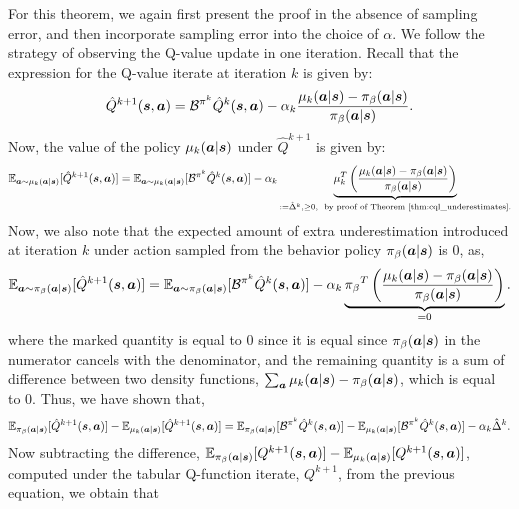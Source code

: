 For this theorem, we again first present the proof in the absence of sampling error, and then incorporate sampling error into the choice of $\alpha$. We follow the strategy of observing the Q-value update in one iteration. Recall that the expression for the Q-value iterate at iteration $k$ is given by:
\begin{equation*}
    \hat{Q}^{k+1}(\boldsymbol{s}, \boldsymbol{a}) = \mathcal{B}^{\pi^k} \hat{Q}^{k}(\boldsymbol{s}, \boldsymbol{a}) - \alpha_k \frac{\mu_k(\boldsymbol{a}|\boldsymbol{s}) - {\pi_\beta}(\boldsymbol{a}|\boldsymbol{s})}{{\pi_\beta}(\boldsymbol{a}|\boldsymbol{s})}.
\end{equation*}
Now, the value of the policy $\mu_{k}(\boldsymbol{a}|\boldsymbol{s})$ under $\hat{Q}^{k+1}$ is given by:
\begin{equation*}
    \mathbb{E}_{\boldsymbol{a} \sim \mu_k(\boldsymbol{a}|\boldsymbol{s})}[\hat{Q}^{k+1}(\boldsymbol{s}, \boldsymbol{a})] = \mathbb{E}_{\boldsymbol{a} \sim \mu_k(\boldsymbol{a}|\boldsymbol{s})}[\mathcal{B}^{\pi^k} \hat{Q}^k (\boldsymbol{s}, \boldsymbol{a})] - \alpha_k \underbrace{\mu_k^T \left(\frac{\mu_k(\boldsymbol{a}|\boldsymbol{s}) - {\pi_\beta}(\boldsymbol{a}|\boldsymbol{s})}{{\pi_\beta}(\boldsymbol{a}|\boldsymbol{s})} \right)}_{:= \hat{\Delta}^k, \geq 0, \text{~~by proof of Theorem~\ref{thm:cql_underestimates}.}} 
\end{equation*}
Now, we also note that the expected amount of extra underestimation introduced at iteration $k$ under action sampled from the behavior policy ${\pi_\beta}(\boldsymbol{a}|\boldsymbol{s})$ is 0, as,
\begin{equation*}
    \mathbb{E}_{\boldsymbol{a} \sim {\pi_\beta}(\boldsymbol{a}|\boldsymbol{s})}[\hat{Q}^{k+1}(\boldsymbol{s}, \boldsymbol{a})] = \mathbb{E}_{\boldsymbol{a} \sim {\pi_\beta}(\boldsymbol{a}|\boldsymbol{s})}[\mathcal{B}^{\pi^k} \hat{Q}^k (\boldsymbol{s}, \boldsymbol{a})] - \alpha_k \underbrace{{\pi_\beta}^T \left(\frac{\mu_k(\boldsymbol{a}|\boldsymbol{s}) - {\pi_\beta}(\boldsymbol{a}|\boldsymbol{s})}{{\pi_\beta}(\boldsymbol{a}|\boldsymbol{s})} \right)}_{= 0}. 
\end{equation*}
where the marked quantity is equal to 0 since it is equal since ${\pi_\beta}(\boldsymbol{a}|\boldsymbol{s})$ in the numerator cancels with the denominator, and the remaining quantity is a sum of difference between two density functions, $\sum_{\boldsymbol{a}} \mu_k(\boldsymbol{a}|\boldsymbol{s}) - {\pi_\beta}(\boldsymbol{a}|\boldsymbol{s})$, which is equal to 0. Thus, we have shown that,
\begin{equation*}
    \mathbb{E}_{{\pi_\beta}(\boldsymbol{a}|\boldsymbol{s})}[\hat{Q}^{k+1}(\boldsymbol{s}, \boldsymbol{a})] - \mathbb{E}_{\mu_k(\boldsymbol{a}|\boldsymbol{s})}[\hat{Q}^{k+1}(\boldsymbol{s}, \boldsymbol{a})] = \mathbb{E}_{{\pi_\beta}(\boldsymbol{a}|\boldsymbol{s})}[\mathcal{B}^{\pi^k} \hat{Q}^k (\boldsymbol{s}, \boldsymbol{a})] - \mathbb{E}_{\mu_k(\boldsymbol{a}|\boldsymbol{s})}[\mathcal{B}^{\pi^k} \hat{Q}^k (\boldsymbol{s}, \boldsymbol{a})] - \alpha_k \hat{\Delta}^k.
\end{equation*}
Now subtracting the difference, $\mathbb{E}_{{\pi_\beta}(\boldsymbol{a}|\boldsymbol{s})}[Q^{k+1}(\boldsymbol{s}, \boldsymbol{a})] - \mathbb{E}_{\mu_k(\boldsymbol{a}|\boldsymbol{s})}[Q^{k+1}(\boldsymbol{s}, \boldsymbol{a})]$, computed under the tabular Q-function iterate, $Q^{k+1}$, from the previous equation, we obtain that
